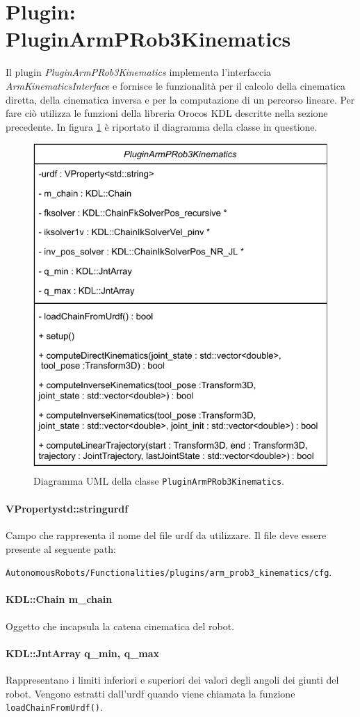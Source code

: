 \section{Plugin: PluginArmPRob3Kinematics}
Il plugin \textit{PluginArmPRob3Kinematics} implementa l'interfaccia \textit{ArmKinematicsInterface} e fornisce le funzionalità per il calcolo della cinematica diretta, della cinematica inversa e per la computazione di un percorso lineare. Per fare ciò utilizza le funzioni della libreria Orocos KDL descritte nella sezione precedente. 
In figura \ref{fig:plugin_uml} è riportato il diagramma della classe in questione.
\begin{figure}[ht!]
	\centering
	\includegraphics[width=0.5\linewidth]{./ImageFiles/PluginArmPRob3Kinematics.drawio.pdf}
	\caption{Diagramma UML della classe \texttt{PluginArmPRob3Kinematics}.}
	\label{fig:plugin_uml}
\end{figure}

\paragraph{VProperty\tl std::string\tr urdf}
Campo che rappresenta il nome del file urdf da utilizzare. Il file deve essere presente al seguente path: \\
\centerline{\texttt{AutonomousRobots/Functionalities/plugins/arm\_prob3\_kinematics/cfg}.}

\paragraph{KDL::Chain m\_chain}
Oggetto che incapsula la catena cinematica del robot.

\paragraph{KDL::JntArray q\_min, q\_max}
Rappresentano i limiti inferiori e superiori dei valori degli angoli dei giunti del robot. Vengono estratti dall'urdf quando viene chiamata la funzione \texttt{loadChainFromUrdf()}.

